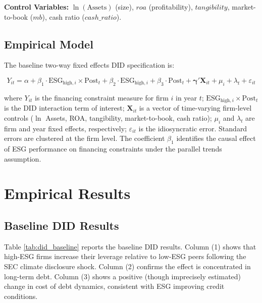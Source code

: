 \documentclass[11pt,a4paper]{article}
\begin{document}
\textbf{Control Variables:} $\ln(\mathrm{Assets})$ (size), $\mathit{roa}$ (profitability), $\mathit{tangibility}$, market-to-book ($\mathit{mb}$), cash ratio ($\mathit{cash\_ratio}$).

\subsection{Empirical Model}

The baseline two-way fixed effects DID specification is:

\begin{equation}
Y_{it} = \alpha + \beta_1 \cdot \mathrm{ESG}_{\mathrm{high},i} \times \mathrm{Post}_t + \beta_2 \cdot \mathrm{ESG}_{\mathrm{high},i} + \beta_3 \cdot \mathrm{Post}_t + \bm{\gamma}'\bm{X}_{it} + \mu_i + \lambda_t + \varepsilon_{it}
\label{eq:did}
\end{equation}

where $Y_{it}$ is the financing constraint measure for firm $i$ in year $t$; $\mathrm{ESG}_{\mathrm{high},i} \times \mathrm{Post}_t$ is the DID interaction term of interest; $\bm{X}_{it}$ is a vector of time-varying firm-level controls ($\ln$ Assets, ROA, tangibility, market-to-book, cash ratio); $\mu_i$ and $\lambda_t$ are firm and year fixed effects, respectively; $\varepsilon_{it}$ is the idiosyncratic error. Standard errors are clustered at the firm level. The coefficient $\beta_1$ identifies the causal effect of ESG performance on financing constraints under the parallel trends assumption.

\section{Empirical Results}





\subsection{Baseline DID Results}

Table \ref{tab:did_baseline} reports the baseline DID results. Column (1) shows that high-ESG firms increase their leverage relative to low-ESG peers following the SEC climate disclosure shock. Column (2) confirms the effect is concentrated in long-term debt. Column (3) shows a positive (though imprecisely estimated) change in cost of debt dynamics, consistent with ESG improving credit conditions.
\end{document}

